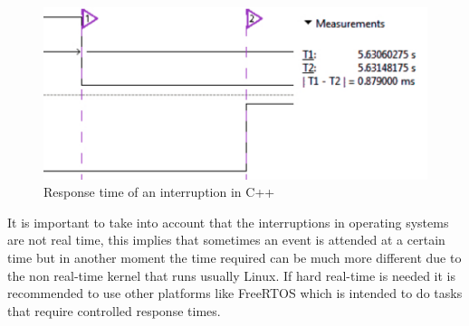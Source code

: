 \begin{figure}[H]\begin{center}
 \centering
  \captionsetup{justification=centering}
  \includegraphics[scale=0.65]{pictures/performance-tests/Interruptions/cxx}
  \caption{Response time of an interruption in C++\label{fig:interrupt-cxx}}
\end{center}\end{figure}
It is important to take into account that the interruptions in operating systems are not real time, this implies that sometimes an event is attended at a certain time but in another moment the time required can be much more different due to the non real-time kernel that runs usually Linux. If hard real-time is needed it is recommended to use other platforms like FreeRTOS which is intended to do tasks that require controlled response times.